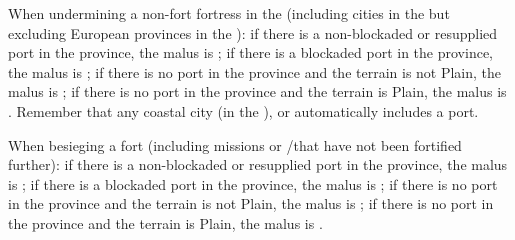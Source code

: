  When undermining a non-fort fortress in
the \ROTW (including cities in the \ROTW but excluding European provinces in
the \ROTW):
\bparag if there is a non-blockaded or resupplied port in the province, the
malus is ;
\bparag if there is a blockaded port in the province, the malus is ;
\bparag if there is no port in the province and the terrain is not Plain, the
malus is ;
\bparag if there is no port in the province and the terrain is Plain, the
malus is .
\bparag Remember that any coastal city (in the \ROTW), \COL or \TP
automatically includes a port.

 When besieging a fort (including missions or
\COL/\TP that have not been fortified further):
\bparag if there is a non-blockaded or resupplied port in the province, the
malus is ;
\bparag if there is a blockaded port in the province, the malus is ;
\bparag if there is no port in the province and the terrain is not Plain, the
malus is ;
\bparag if there is no port in the province and the terrain is Plain, the
malus is .

